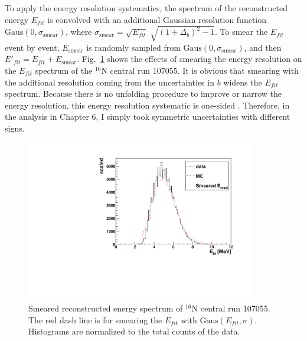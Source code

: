 To apply the energy resolution systematics, the spectrum of the reconstructed energy $E_{fit}$ is convolved with an additional Gaussian resolution function $\mathrm{Gaus}(0,\sigma_\mathrm{smear})$, where $\sigma_\mathrm{smear}=\sqrt{E_{fit}} \; \sqrt{(1+\Delta_{b})^2-1}$. To smear the $E_{fit}$ event by event, $E_\mathrm{smear}$ is randomly sampled from $\mathrm{Gaus}(0,\sigma_\mathrm{smear})$, and then $E'_{fit}=E_{fit}+E_\mathrm{smear}$. Fig.~\ref{fig:EresolSmear} shows the effects of smearing the energy resolution on the $E_{fit}$ spectrum of the $^{16}$N central run 107055. It is obvious that smearing with the additional resolution coming from the uncertainties in $b$ widens the $E_{fit}$ spectrum. Because there is no unfolding procedure to improve or narrow the energy resolution, this energy resolution systematic is one-sided \cite{marzec2019measurement}. Therefore, in the analysis in Chapter 6, I simply took symmetric uncertainties with different signs.
\begin{figure}
	\centering
	\includegraphics[width=10cm]{SmearedEresol_N16_new.pdf}
	\caption[Smeared reconstructed energy spectrum of $^{16}$N central run 107055.]{Smeared reconstructed energy spectrum of $^{16}$N central run 107055. The red dash line is for smearing the $E_{fit}$ with $\mathrm{Gaus}(E_{fit},\sigma)$. Histograms are normalized to the total counts of the data.\label{fig:EresolSmear}}
\end{figure}
